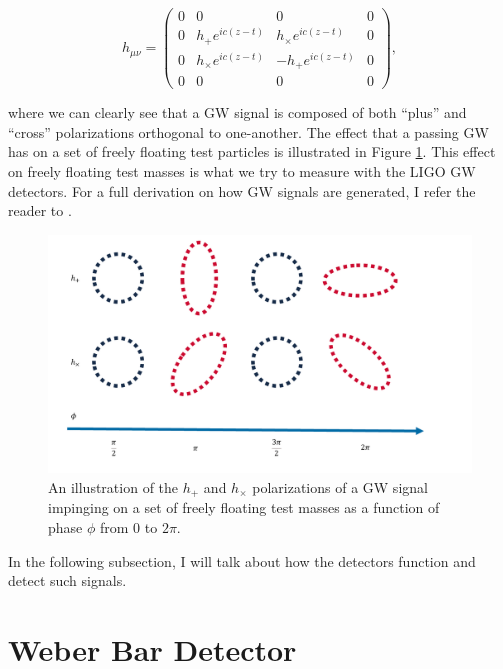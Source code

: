 \begin{equation}
  h_{\mu \nu} =   \begin{pmatrix}
0 & 0 & 0 & 0\\
0 & h_{+}e^{ic(z-t)} & h_{\times}e^{ic(z-t)} & 0\\
0 & h_{\times}e^{ic(z-t)} & -h_{+}e^{ic(z-t)} & 0\\
0 & 0 & 0 & 0
\end{pmatrix},
\end{equation}

where we can clearly see that a \ac{GW} signal is composed of both ``plus'' and ``cross'' polarizations orthogonal to one-another. The effect that a passing \ac{GW} has on a set of freely floating test particles is illustrated in Figure \ref{fig:gw_plus_cross}. This effect on freely floating test masses is what we try to measure with the \ac{LIGO} \ac{GW} detectors. For a full derivation on how \ac{GW} signals are generated, I refer the reader to \cite{Flanagan_2005}. 

\begin{figure}
    \centering
    \includegraphics[width=\linewidth]{figures/GW_polarizations_thesis_figure.png}
    \caption[$h_+$ and $h_\times$ polarization illustration]{An illustration of the $h_+$ and $h_\times$ polarizations of a \ac{GW} signal impinging on a set of freely floating test masses as a function of phase $\phi$ from $0$ to $2\pi$.}
    \label{fig:gw_plus_cross}
\end{figure}

In the following subsection, I will talk about how the detectors function and detect such signals.

\section{Weber Bar Detector}

